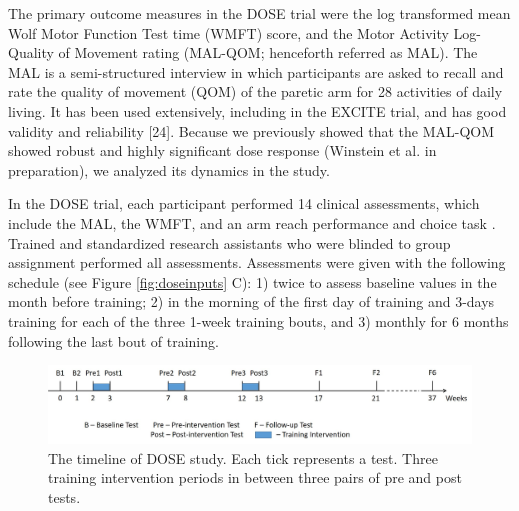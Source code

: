 The primary outcome measures in the DOSE trial were the log transformed mean Wolf Motor Function Test time (WMFT) score, and the Motor Activity Log-Quality of Movement rating (MAL-QOM; henceforth referred as MAL). 
The MAL is a semi-structured interview in which participants are asked to recall and rate the quality of movement (QOM) of the paretic arm for 28 activities of daily living. 
It has been used extensively, including in the EXCITE trial, and has good validity and reliability [24]. 
Because we previously showed that the MAL-QOM showed robust and highly significant dose response (Winstein et al. in preparation), we analyzed its dynamics in the study.

In the DOSE trial, each participant performed 14 clinical assessments, which include the MAL, the WMFT, and an arm reach performance and choice task \cite{Park2016}. 
Trained and standardized research assistants who were blinded to group assignment performed all assessments. 
Assessments were given with the following schedule (see Figure \ref{fig:doseinputs} C): 1) twice to assess baseline values in the month before training; 2) in the morning of the first day of training and 3-days training for each of the three 1-week training bouts, and 3) monthly for 6 months following the last bout of training.  

\begin{figure}
	\centering
	\includegraphics[width=1\linewidth]{figures/dosetimeline}
	\caption[DOSE Study Timeline]{The timeline of DOSE study. Each tick represents a test. Three training intervention periods in between three pairs of pre and post tests.}
	\label{fig:dosetimeline}
\end{figure}

